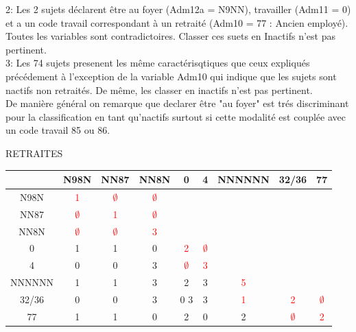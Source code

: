 \documentclass{book}
\begin{document}
2: Les 2 sujets déclarent être au foyer (Adm12a = N9NN), travailler (Adm11 = 0) et a un code travail correspondant à un retraité (Adm10 = 77 : Ancien employé). Toutes les variables sont contradictoires. Classer ces suets en Inactifs n'est pas pertinent.\\

3: Les 74 sujets presenent les même caractérisqtiques que ceux expliqués précédement à l'exception de la variable Adm10 qui indique que les sujets sont nactifs non retraités. De même, les classer en inactifs n'est pas pertinent.\\

\noindent
De manière général on remarque que declarer être "au foyer" est trés discriminant pour la classification en tant qu'nactifs surtout si cette modalité est couplée avec un code travail 85 ou 86.


\begin{center}RETRAITES\end{center}
\begin{center}
\setlength\arrayrulewidth{.5pt}
\begin{tabular}{|c||ccc||cc||c||c||c|}
\hline
 &N98N &NN87& NN8N& 0& 4& NNNNNN& 32/36& 77\\
 \hline
 \hline
 N98N &\textcolor{red}{1}& \textcolor{red}{$\emptyset$}& \textcolor{red}{$\emptyset$} & & & & & \\
NN87 & \textcolor{red}{$\emptyset$} & \textcolor{red}{1} &\textcolor{red}{$\emptyset$}& & & & & \\
NN8N & \textcolor{red}{$\emptyset$} & \textcolor{red}{$\emptyset$} & \textcolor{red}{3} & & & & & \\
\hline
\hline
0 & 1 & 1 & 0 & \textcolor{red}{2} & \textcolor{red}{$\emptyset$} &&&\\
4 & 0 & 0 & 3 & \textcolor{red}{$\emptyset$} & \textcolor{red}{3} &&&\\
\hline
\hline
NNNNNN & 1 & 1 & 3 & 2 & 3 & \textcolor{red}{5} & & \\
\hline
\hline
32/36 & 0 & 0 & 3 & 0 3 &3 & \textcolor{red}{1} & \textcolor{red}{2} & \textcolor{red}{$\emptyset$}\\
\hline
\hline
77 & 1 & 1 & 0 & 2 & 0 & 2 & \textcolor{red}{$\emptyset$} & \textcolor{red}{2}\\
\hline
\end{tabular}
\end{center}
\end{document}
